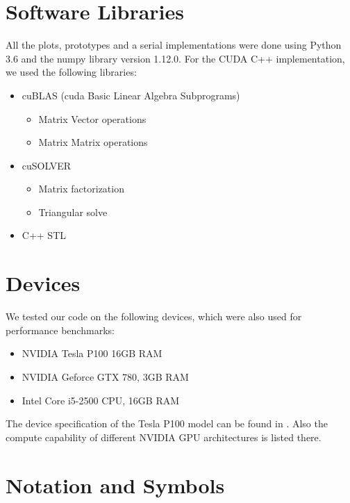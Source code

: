 \section{Software Libraries} \label{sec_libraries}
All the plots, prototypes and a serial implementations were done using Python 3.6 and the numpy library version 1.12.0. For the CUDA C++ implementation, we used the following libraries:
\begin{itemize}
	\item cuBLAS (cuda Basic Linear Algebra Subprograms)
	\begin{itemize}
		\item Matrix Vector operations
		\item Matrix Matrix operations
	\end{itemize}
	\item cuSOLVER
	\begin{itemize}
		\item Matrix factorization
		\item Triangular solve
	\end{itemize}
	\item C++ STL
\end{itemize}

\section{Devices} \label{sec_devides}
We tested our code on the following devices, which were also used for performance benchmarks:
\begin{itemize}
	\item NVIDIA Tesla P100 16GB RAM
	\item NVIDIA Geforce GTX 780, 3GB RAM
	\item Intel Core i5-2500 CPU, 16GB RAM
\end{itemize}
The device specification of the Tesla P100 model can be found in \cite{tesla_p100_whitepaper}. Also the compute capability of different NVIDIA GPU architectures is listed there.

\section{Notation and Symbols} \label{sec_notation}
